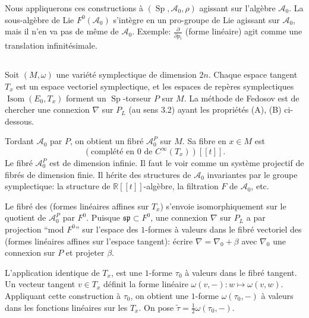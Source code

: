 \documentclass[11pt,a4paper]{article}
\theoremstyle{plain}
\theoremstyle{definition}
\DeclareMathOperator{\Sp}{Sp}
\DeclareMathOperator{\Isom}{Isom}
\newcommand{\R}{\mathbb{R}}
\begin{document}
Nous appliquerons ces constructions \`a $(\Sp, \mathcal{A}_{0}, \rho)$ agissant sur l'alg\`ebre $\mathcal{A}_{0}$.
La sous-alg\`ebre de Lie $F^{0}(\mathcal{A}_{0})$ s'int\`egre en un pro-groupe de Lie agissant sur $\mathcal{A}_{0}$,
mais il n'en va pas de m\^eme de $\mathcal{A}_{0}$. Exemple: $\frac{\partial}{\partial p_{i}}$ (forme lin\'eaire) agit comme une
translation infinit\'esimale.

\subsection{}
Soit $(M,\omega)$ une vari\'et\'e symplectique de dimension $2n$. Chaque espace tangent
$T_{x}$ est un espace vectoriel symplectique, et les espaces de rep\`eres symplectiques
$\Isom(E_{0}, T_{x})$ forment un $\Sp$-torseur $P$ sur $M$. La m\'ethode de Fedosov est de
chercher une connexion $\nabla$ sur $P_{L}$ (au sens 3.2) ayant les propri\'et\'es (A), (B)
ci-dessous.

Tordant $\mathcal{A}_{0}$ par $P$, on obtient un fibr\'e $\mathcal{A}_{0}^{P}$ sur $M$. Sa fibre en $x \in M$ est
\begin{equation}
(\text{compl\'et\'e en } 0 \text{ de } C^{\infty}(T_{x}))[[t]]. \tag{3.3.1}
\end{equation}
Le fibr\'e $\mathcal{A}_{0}^{P}$ est de dimension infinie. Il faut le voir comme un syst\`eme projectif de fibr\'es de dimension finie. Il h\'erite des structures de $\mathcal{A}_{0}$ invariantes par le groupe symplectique: la structure de $\R[[t]]$-alg\`ebre, la filtration $F$ de $\mathcal{A}_{0}$, etc.

Le fibr\'e des (formes lin\'eaires affines sur $T_{x}$) s'envoie isomorphiquement sur
le quotient de $\mathcal{A}_{0}^{P}$ par $F^{0}$. Puisque $\mathfrak{sp} \subset F^{0}$, une connexion $\nabla$ sur $P_{L}$ a par
projection ``mod $F^{0}$'' sur l'espace des $1$-formes \`a valeurs dans le fibr\'e vectoriel
des (formes lin\'eaires affines sur l'espace tangent): \'ecrire $\nabla = \nabla_{0} + \beta$ avec $\nabla_{0}$ une
connexion sur $P$ et projeter $\beta$.

L'application identique de $T_{x}$, est une $1$-forme $\tau_{0}$ \`a valeurs dans le fibr\'e tangent.
Un vecteur tangent $v \in T_{x}$ d\'efinit la forme lin\'eaire $\omega(v, - ): w \mapsto \omega(v, w)$. Appliquant
cette construction \`a $\tau_{0}$, on obtient une $1$-forme $\omega(\tau_{0}, -)$ \`a valeurs dans les fonctions
lin\'eaires sur les $T_{x}$. On pose $\tilde{\tau} = \frac{1}{2} \omega(\tau_{0}, -)$.
\end{document}
